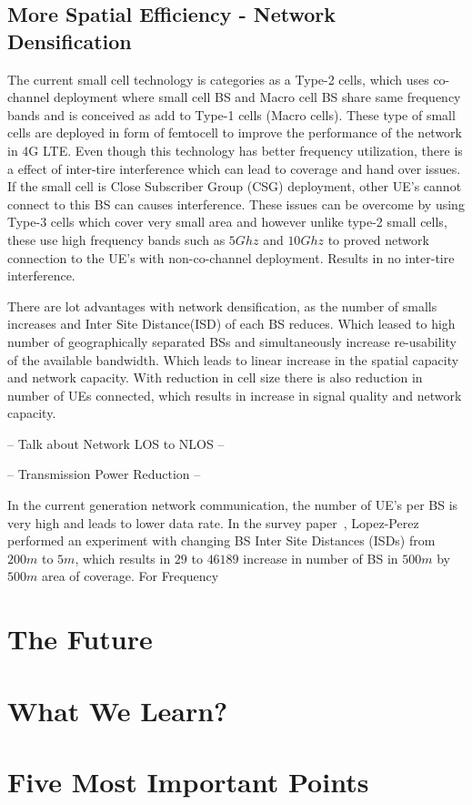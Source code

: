 \documentclass[12pt,onecolumn]{IEEEtran}
\begin{document}
\subsection{More Spatial Efficiency - Network Densification}
\label{subsec:MS}
The current small cell technology is categories as a Type-2 cells, which uses co-channel deployment where small cell BS and Macro cell BS share same frequency bands and is conceived as add to Type-1 cells (Macro cells). These type of small cells are deployed in form of femtocell to improve the performance of the network in 4G LTE. Even though this technology has better frequency utilization, there is a effect of inter-tire interference which can lead to coverage and hand over issues. If the small cell is Close Subscriber Group (CSG) deployment, other UE's cannot connect to this BS can causes interference. These issues can be overcome by using Type-3 cells which cover very small area and however unlike type-2 small cells, these use high frequency bands such as $5Ghz$ and $10Ghz$ to proved network connection to the UE's with non-co-channel deployment. Results in no inter-tire interference.

There are lot advantages with network densification, as the number of smalls increases and Inter Site Distance(ISD) of each BS reduces. Which leased to high number of geographically separated BSs and simultaneously increase re-usability of the available bandwidth. Which leads to linear increase in the spatial capacity and network capacity.
With reduction in cell size there is also reduction in number of UEs connected, which results in increase in signal quality and network capacity.

-- Talk about Network LOS to NLOS --

-- Transmission Power Reduction --

In the current generation network communication, the number of UE's per BS is very high and leads to lower data rate. In the survey paper~\cite{main_paper}, Lopez-Perez performed an experiment with changing BS Inter Site Distances (ISDs) from $200m$ to $5m$, which results in $29$ to $46189$ increase in number of BS in $500m$ by $500m$ area of coverage. For Frequency  
\section{The Future}
\label{sec:TF}

\section{What We Learn?}
\label{sec:WWL}

\section{Five Most Important Points}
\label{sec:FMIP}
\ifCLASSOPTIONcaptionsoff
  \newpage
\fi



\end{document}
